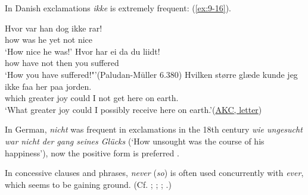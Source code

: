 In Danish exclamations \textit{ikke} is extremely frequent: (\ref{ex:9-16}).

\ea \label{ex:9-16}
\ea
 \gll Hvor var han dog ikke rar!\\
 how was he yet not nice\\
\glt `How nice he was!'
\ex
 \gll Hvor har ei da du liidt!\\
 how have not then you suffered\\
\glt `How you have suffered!"'\hfill(Paludan-Müller 6.380) %
\ex
 \gll Hvilken større glæde kunde jeg ikke faa her paa jorden.\\
 which greater joy could I not get here on earth.\DEF{}\\
\glt `What greater joy could I possibly receive here on earth.'\hfill(\href{https://tekster.kb.dk/text/adl-texts-larsenk_11-root#s124}{AKC, letter})
\z
\z

In German, \textit{nicht} was frequent in exclamations in the 18th century \textit{wie ungesucht war nicht der gang seines Glücks} (`How unsought was the course of his happiness'), now the positive form is preferred \citep[\href{https://archive.org/details/deutscheswrte00paul/page/382/mode/2up?view=theater}{383}]{paul_deutsches_1908}.

In concessive clauses and phrases, \textit{never} (\textit{so}) is often used concurrently with \textit{ever}, which seems to be gaining ground. (Cf. \citet[\href{https://archive.org/details/shakespeariangra0000edwi/page/44/mode/2up?view=theater}{§52}]{abbott1894shakespearian}; \citet[\href{https://archive.org/details/p2englischephilo01storuoft/page/702/mode/2up?view=theater}{702}]{storm1896englische}; \citet[\href{https://archive.org/details/queensenglishstr00alfo/page/62/mode/2up?q=\%22160\%22&view=theater}{62}]{alford1888queens}; \citet[88]{bogholm1906bacon}.)

